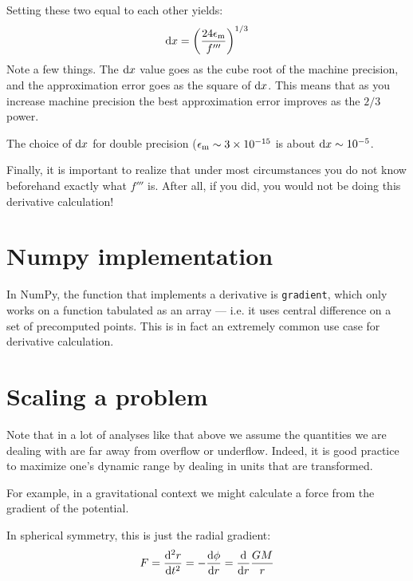 Setting these two equal to each other yields:
\begin{equation}
{\rm d}x = \left(\frac{24 \epsilon_{\rm m}}{f'''}\right)^{1/3}
\end{equation}
Note a few things. The ${\rm d}x$ value goes as the cube root of the
machine precision, and the approximation error goes as the square of
${\rm d}x$. This means that as you increase machine precision the best
approximation error improves as the $2/3$ power.

The choice of ${\rm d}x$ for double precision ($\epsilon_{\rm m} \sim
3\times 10^{-15}$ is about ${\rm d}x \sim 10^{-5}$.

Finally, it is important to realize that under most circumstances you
do not know beforehand exactly what $f'''$ is. After all, if you did,
you would not be doing this derivative calculation!

\section{Numpy implementation}

In NumPy, the function that implements a derivative is {\tt gradient},
which only works on a function tabulated as an array --- i.e. it uses
central difference on a set of precomputed points. This is in fact an
extremely common use case for derivative calculation.

\section{Scaling a problem}

Note that in a lot of analyses like that above we assume the
quantities we are dealing with are far away from overflow or
underflow. Indeed, it is good practice to maximize one's dynamic range
by dealing in units that are transformed. 

For example, in a gravitational context we might calculate a force
from the gradient of the potential.


\begin{answer}
In spherical symmetry, this is
just the radial gradient:
\begin{equation}
F = \frac{{\rm d}^2r}{{\rm d}t^2} = - \frac{{\rm d}\phi}{{\rm d}r} =
\frac{{\rm d}}{{\rm d}r} \frac{GM}{r}
\end{equation}
\end{answer}

